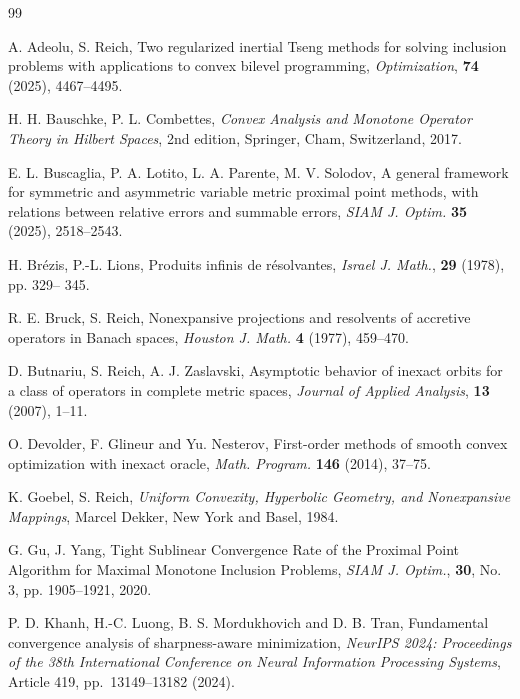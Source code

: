 \documentclass[12pt]{article}
\theoremstyle{plain}
\begin{document}
\begin{thebibliography}{99}

  { {\sc A. Adeolu, S. Reich}, Two regularized inertial Tseng methods for solving inclusion problems with applications to convex bilevel programming, {\it Optimization}, {\bf 74} (2025), 4467--4495. }


{\sc H. H. Bauschke, P. L. Combettes},
{\it Convex Analysis and Monotone Operator Theory in Hilbert Spaces}, 2nd edition,
Springer, Cham, Switzerland, 2017.

{\sc E. L. Buscaglia, P. A. Lotito, L. A. Parente, M. V. Solodov},
A general framework for symmetric and asymmetric variable metric proximal point methods, with relations between relative errors and summable errors,
{\it SIAM J. Optim.}
{\bf 35} (2025), 2518--2543.

{  {\sc H. Br\'ezis, P.-L. Lions}, Produits infinis de r\'esolvantes, {\it Israel J. Math.}, {\bf 29} (1978), pp. 329--
345.}

{  {\sc R. E. Bruck, S. Reich}, Nonexpansive projections and resolvents of accretive operators in Banach spaces, {\it Houston J. Math.} {\bf 4} (1977), 459--470.}

{  {\sc D. Butnariu, S. Reich, A. J. Zaslavski}, { Asymptotic behavior of inexact orbits for a class of operators in complete metric spaces}, {\it Journal of Applied Analysis}, {\bf 13} (2007), 1--11.}

  {\sc O. Devolder, F. Glineur and Yu. Nesterov}, First-order methods of smooth convex optimization with
inexact oracle, {\it Math. Program.} {\bf 146} (2014), 37--75.

{  {\sc  K. Goebel, S. Reich}, {\it Uniform Convexity, Hyperbolic Geometry, and Nonexpansive Mappings}, Marcel Dekker, New York and Basel, 1984.}

{  {\sc  G. Gu, J. Yang}, Tight Sublinear Convergence Rate of the Proximal Point Algorithm for Maximal Monotone Inclusion Problems,  {\it SIAM J. Optim.},  {\bf 30}, No. 3, pp. 1905--1921, 2020.}



{\sc P. D. Khanh, H.-C. Luong, B. S. Mordukhovich and D. B. Tran},
Fundamental convergence analysis of sharpness-aware minimization, {\it NeurIPS 2024: Proceedings of the 38th International Conference on Neural Information Processing Systems},
Article 419, pp.\ 13149--13182 (2024).


\end{thebibliography}
\end{document}
